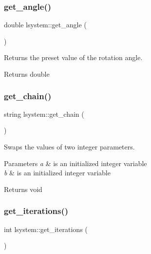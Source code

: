 \subsubsection{\texorpdfstring{get\+\_\+angle()}{get\_angle()}}
{\footnotesize\ttfamily double lsystem\+::get\+\_\+angle (\begin{DoxyParamCaption}{ }\end{DoxyParamCaption})}



Returns the preset value of the rotation angle. 

\begin{DoxyReturn}{Returns}
double 
\end{DoxyReturn}
\mbox{\label{classlsystem_a1cb69fe5e7d47bb6eafb397dd9640571}} 
\subsubsection{\texorpdfstring{get\+\_\+chain()}{get\_chain()}}
{\footnotesize\ttfamily string lsystem\+::get\+\_\+chain (\begin{DoxyParamCaption}{ }\end{DoxyParamCaption})}



Swaps the values of two integer parameters. 


\begin{DoxyParams}{Parameters}
{\em a} & is an initialized integer variable \\
\hline
{\em b} & is an initialized integer variable \\
\hline
\end{DoxyParams}
\begin{DoxyReturn}{Returns}
void 
\end{DoxyReturn}
\mbox{\label{classlsystem_a3e01f9aa5993a3bc4e742de38c115c6c}} 
\subsubsection{\texorpdfstring{get\+\_\+iterations()}{get\_iterations()}}
{\footnotesize\ttfamily int lsystem\+::get\+\_\+iterations (\begin{DoxyParamCaption}{ }\end{DoxyParamCaption})}



